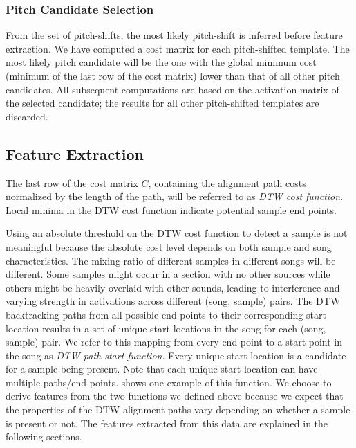 \documentclass{article}
\begin{document}
\subsubsection{Pitch Candidate Selection}
From the set of pitch-shifts, the most likely pitch-shift is inferred before feature extraction. We have computed a cost matrix for each pitch-shifted template. The most likely pitch candidate will be the one with the global minimum cost (minimum of the last row of the cost matrix) lower than that of all other pitch candidates. All subsequent computations are based on the activation matrix of the selected candidate; the results for all other pitch-shifted templates are discarded.

\subsection{Feature Extraction}
The last row of the cost matrix $C$, containing the alignment path costs normalized by the length of the path, will be referred to as \textit{DTW cost function}. Local minima in the DTW cost function indicate potential sample end points.

Using an absolute threshold on the DTW cost function to detect a sample is not meaningful because the absolute cost level depends on both sample and song characteristics. The mixing ratio of different samples in different songs will be different. Some samples might occur in a section with no other sources while others might be heavily overlaid with other sounds, leading to interference and varying strength in activations across different (song, sample) pairs. The DTW backtracking paths from all possible end points to their corresponding start location results in a set of unique start locations in the song for each (song, sample) pair. We refer to this mapping from every end point to a start point in the song as \textit{DTW path start function}. Every unique start location is a candidate for a sample being present. Note that each unique start location can have multiple paths/end points.  shows one example of this function.
We choose to derive features from the two functions we defined above because we expect that the properties of the DTW alignment paths vary depending on whether a sample is present or not. The features extracted from this data are explained in the following sections. 
\end{document}

